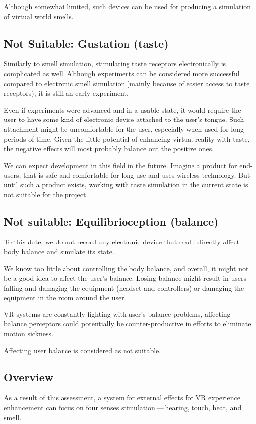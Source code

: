 Although somewhat limited, such devices can be used for producing a simulation
of virtual world smells.


\hypertarget{x-not-suitable:-gustation-(taste)}{\subsection{Not Suitable: Gustation (taste)}}
Similarly to smell simulation, stimulating taste receptors electronically is
complicated as well. Although experiments can be considered more successful
compared to electronic smell simulation (mainly because of easier access
to taste receptors), it is still an early experiment. \hyperlink{stsie}{}


Even if experiments were advanced and in a usable state, it would
require the user to have some kind of electronic device attached to the user’s
tongue. Such attachment might be uncomfortable for the user, especially when
used for long periods of time. Given the little potential of enhancing virtual
reality with taste, the negative effects will most probably balance out
the positive ones.


We can expect development in this field in the future. Imagine a product
for end-users, that is safe and comfortable for long use and uses wireless
technology. But until such a product exists, working with taste simulation
in the current state is not suitable for the project.


\hypertarget{x-not-suitable:-equilibrioception-(balance)}{\subsection{Not suitable: Equilibrioception (balance)}}
To this date, we do not record any electronic device that could
directly affect body balance and simulate its state.


We know too little about controlling the body balance, and overall,
it might not be a good idea to affect the user’s balance. Losing
balance might result in users falling and damaging the equipment (headset and
controllers) or damaging the equipment in the room around the user.


VR systems are constantly fighting with user’s balance problems,
affecting balance perceptors could potentially be
counter-productive in efforts to eliminate motion sickness.


Affecting user balance is considered as not suitable.


\hypertarget{x-overview}{\subsection{Overview}}
As a result of this assessment, a system for external effects for VR experience
enhancement can focus on four senses stimulation — hearing, touch, heat,
and smell.


